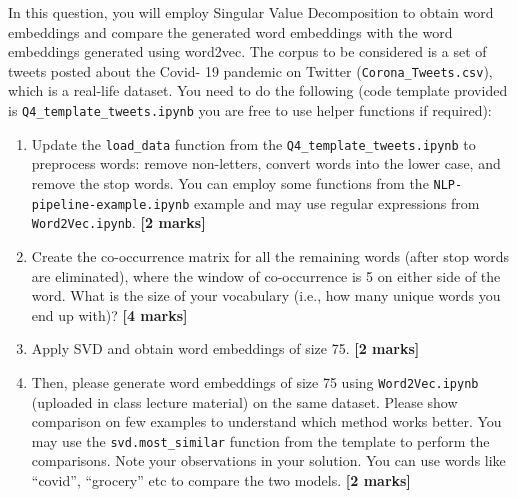 \item In this question, you will employ Singular Value Decomposition to obtain word embeddings and compare the generated word embeddings with the word embeddings generated using word2vec. The corpus to be considered is a set of tweets posted about the Covid- 19 pandemic on Twitter (\lstinline{Corona_Tweets.csv}), which is a real-life dataset. You need to do the following (code template provided is \lstinline{Q4_template_tweets.ipynb} you are free to use helper functions if required):
\begin{enumerate}
  \item Update the \lstinline{load_data} function from the \lstinline{Q4_template_tweets.ipynb} to preprocess words: remove non-letters, convert words into the lower case, and remove the stop words. You can employ some functions from the \lstinline{NLP-pipeline-example.ipynb} example and may use regular expressions from \lstinline{Word2Vec.ipynb}. {\bf [2 marks]}
  \item Create the co-occurrence matrix for all the remaining words (after stop words are eliminated), where the window of co-occurrence is 5 on either side of the word. What is the size of your vocabulary (i.e., how many unique words you end up with)? \textbf{[4 marks]}
  \item Apply SVD and obtain word embeddings of size 75. {\bf [2 marks]}
  \item Then, please generate word embeddings of size 75 using \lstinline{Word2Vec.ipynb} (uploaded in class lecture material) on the same dataset. Please show comparison on few examples to understand which method works better. You may use the \lstinline{svd.most_similar} function from the template to perform the comparisons. Note your observations in your solution. You can use words like “covid”, “grocery” etc to compare the two models. {\bf [2 marks]}
\end{enumerate}